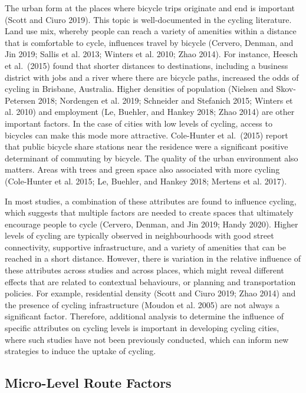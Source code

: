 \documentclass[smallextended]{svjour3}       %
\begin{document}
The urban form at the places where bicycle trips originate and end is
important (Scott and Ciuro 2019). This topic is well-documented in the
cycling literature. Land use mix, whereby people can reach a variety of
amenities within a distance that is comfortable to cycle, influences
travel by bicycle (Cervero, Denman, and Jin 2019; Sallis et al. 2013;
Winters et al. 2010; Zhao 2014). For instance, Heesch et al.~(2015)
found that shorter distances to destinations, including a business
district with jobs and a river where there are bicycle paths, increased
the odds of cycling in Brisbane, Australia. Higher densities of
population (Nielsen and Skov-Petersen 2018; Nordengen et al. 2019;
Schneider and Stefanich 2015; Winters et al. 2010) and employment (Le,
Buehler, and Hankey 2018; Zhao 2014) are other important factors. In the
case of cities with low levels of cycling, access to bicycles can make
this mode more attractive. Cole-Hunter et al.~(2015) report that public
bicycle share stations near the residence were a significant positive
determinant of commuting by bicycle. The quality of the urban
environment also matters. Areas with trees and green space also
associated with more cycling (Cole-Hunter et al. 2015; Le, Buehler, and
Hankey 2018; Mertens et al. 2017).

In most studies, a combination of these attributes are found to
influence cycling, which suggests that multiple factors are needed to
create spaces that ultimately encourage people to cycle (Cervero,
Denman, and Jin 2019; Handy 2020). Higher levels of cycling are
typically observed in neighbourhoods with good street connectivity,
supportive infrastructure, and a variety of amenities that can be
reached in a short distance. However, there is variation in the relative
influence of these attributes across studies and across places, which
might reveal different effects that are related to contextual
behaviours, or planning and transportation policies. For example,
residential density (Scott and Ciuro 2019; Zhao 2014) and the presence
of cycling infrastructure (Moudon et al. 2005) are not always a
significant factor. Therefore, additional analysis to determine the
influence of specific attributes on cycling levels is important in
developing cycling cities, where such studies have not been previously
conducted, which can inform new strategies to induce the uptake of
cycling.

\hypertarget{route}{%
\subsection{Micro-Level Route Factors}\label{route}}
\end{document}
